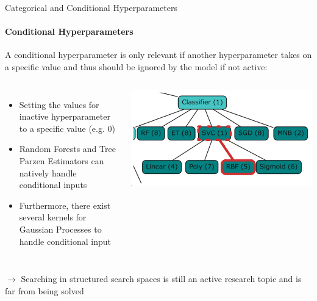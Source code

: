 \begin{frame}[c]{Categorical and Conditional Hyperparameters}
\framesubtitle{Conditional Hyperparameters}

A conditional hyperparameter is only relevant if another hyperparameter takes on a specific value and thus should be ignored by the model if not active:

\begin{columns}[T]
 
\begin{itemize}
    \item <+-> Setting the values for inactive hyperparameter to a specific value (e.g. $0$)
    \item <+-> Random Forests  and Tree Parzen Estimators  can natively handle conditional inputs
    \item <+-> Furthermore, there exist several kernels for Gaussian Processes to handle conditional input    
\end{itemize}
%
\vspace{0.5cm}
\includegraphics[width=1\textwidth]{w06_hpo_bo/images/categ_cond_params/conditional.png}
%
\end{columns}
\pause
\vspace{0.5cm}
$\xrightarrow{}$ Searching in structured search spaces is still an active research topic and is far from being solved
\end{frame}
